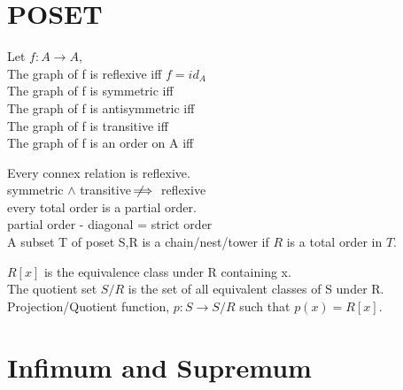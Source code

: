 \section{POSET}
	\begin{remark}Let $f:A \to A$,\\
		The graph of f is reflexive iff $f = id_A$\\
		The graph of f is symmetric iff \\
		The graph of f is antisymmetric iff \\
		The graph of f is transitive iff \\
		The graph of f is an order on A iff
	\end{remark}
	\begin{remark}
		Every connex relation is reflexive.\\
		symmetric $\wedge$ transitive $\not\!\!\!\implies$ reflexive\\
		every total order is a partial order.\\
		partial order - diagonal = strict order\\
		A subset T of poset S,R is a chain/nest/tower if $R$ is a total order in $T$.
	\end{remark}
	\begin{definition}\cite{josh1}
		$R[x]$ is the equivalence class under R containing x.\\
		The quotient set $S/R$ is the set of all equivalent classes of S under R.\\
		Projection/Quotient function, $p:S \to S/R$ such that $p(x) = R[x]$.
	\end{definition}
\section{Infimum and Supremum}

